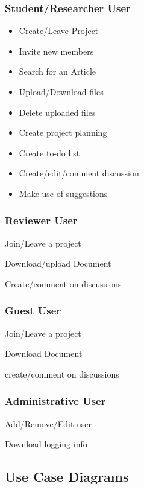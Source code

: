 \subsubsection{Student/Researcher User} 
\begin{itemize}
	\item Create/Leave Project
	\item Invite new members
	\item Search for an Article
	\item Upload/Download files
	\item Delete uploaded files
	\item Create project planning
	\item Create to-do list
	\item Create/edit/comment discussion
	\item Make use of suggestions

\end{itemize}
\subsubsection{Reviewer User} 
	\item Join/Leave a project
	\item Download/upload Document
	\item Create/comment on discussions

\subsubsection{Guest User} 
	\item Join/Leave a project
	\item Download Document
	\item create/comment on discussions
\subsubsection{Administrative User} 
	\item Add/Remove/Edit user
	\item Download logging info

\subsection{Use Case Diagrams} %
\label{sub:subsection_name}



